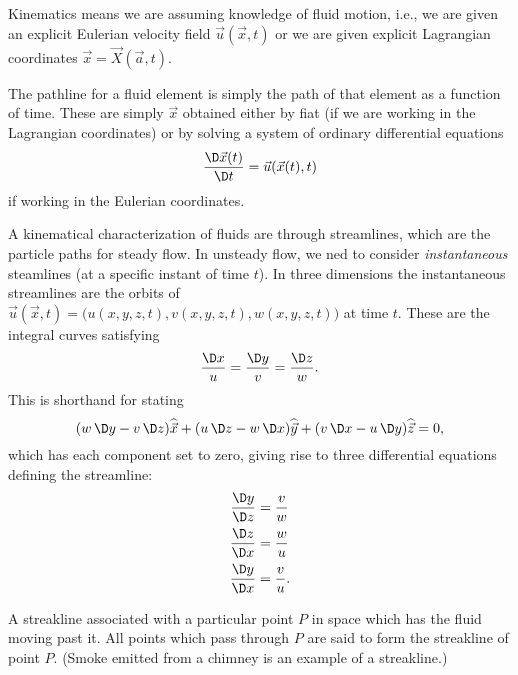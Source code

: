 \begin{node}[Kinematics]\label{fluids:describing-000I}%
Kinematics means we are assuming knowledge of fluid motion, i.e., we are
given an explicit Eulerian velocity field $\vec{u}(\vec{x},t)$ or we are
given explicit Lagrangian coordinates $\vec{x}=\vec{X}(\vec{a},t)$.

\begin{node}[Pathline]\label{fluids:describing-000K}%
The pathline for a fluid element is simply the path of that element as a
function of time. These are simply $\vec{x}$ obtained either by fiat (if
we are working in the Lagrangian coordinates) or by solving a system of
ordinary differential equations
\begin{equation*}
\frac{\D\vec{x}(t)}{\D t}=\vec{u}(\vec{x}(t),t)
\end{equation*}
if working in the Eulerian coordinates.
\end{node} %

\begin{node}[Streamlines]\label{fluids:describing-000J}%
A kinematical characterization of fluids are through streamlines, which
are the particle paths for steady flow. In unsteady flow, we ned to
consider \emph{instantaneous} steamlines (at a specific instant of time
$t$).
In three dimensions the instantaneous streamlines are the orbits of
$\vec{u}(\vec{x},t)=\bigl(u(x,y,z,t),v(x,y,z,t),w(x,y,z,t)\bigr)$
at time $t$. These are the integral curves satisfying
\begin{equation*}
\frac{\D x}{u}=\frac{\D y}{v}=\frac{\D z}{w}.
\end{equation*}
This is shorthand for stating
\begin{equation}
(w\,\D y-v\,\D z)\widehat{\vec{x}}+(u\,\D z-w\,\D x)\widehat{\vec{y}}
+(v\,\D x-u\,\D y)\widehat{\vec{z}}=0,
\end{equation}
which has each component set to zero, giving rise to three differential
equations defining the streamline:
\begin{subequations}
\begin{align}
\frac{\D y}{\D z} & =\frac{v}{w} \\
\frac{\D z}{\D x} & =\frac{w}{u} \\
\frac{\D y}{\D x} & =\frac{v}{u}.
\end{align}
\end{subequations}
\end{node} %

\begin{node}[Streakline]\label{fluids:describing-000L}%
A streakline associated with a particular point $P$ in space which has
the fluid moving past it. All points which pass through $P$ are said to
form the streakline of point $P$. (Smoke emitted from a chimney is an
example of a streakline.)


\end{node}
\end{node}
